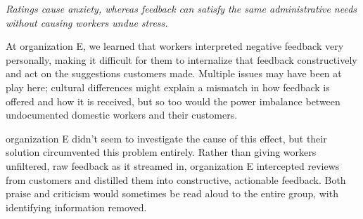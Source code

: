 \textit{Ratings cause anxiety, whereas feedback can satisfy the same administrative needs without causing workers undue stress.}

At organization E, we learned that workers interpreted negative feedback very personally,
making it difficult for them to internalize that feedback constructively and act on the suggestions customers made.
Multiple issues may have been at play here;
cultural differences might explain a mismatch in how feedback is offered and how it is received,
but so too would the power imbalance between undocumented domestic workers and their customers.

organization E didn't seem to investigate the cause of this effect,
but their solution circumvented this problem entirely.
Rather than giving workers unfiltered, raw feedback as it streamed in,
organization E intercepted reviews from customers and distilled them into constructive, actionable feedback.
Both praise and criticism would sometimes be read aloud to the entire group,
with identifying information removed.

